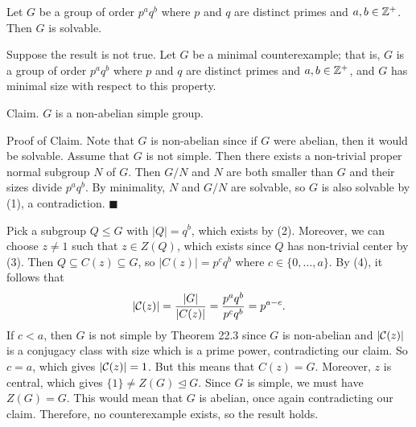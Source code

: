 \begin{theo}{}
    Let $G$ be a group of order $p^a q^b$ where $p$ and $q$ are distinct primes 
    and $a, b \in \mathbb{Z}^+$. Then $G$ is solvable. 
\end{theo}
\begin{pf}
    Suppose the result is not true. Let $G$ be a minimal counterexample; that is, 
    $G$ is a group of order $p^a q^b$ where $p$ and $q$ are distinct primes and 
    $a, b \in \mathbb{Z}^+$, and $G$ has minimal size with respect to this property. 

    {\sc Claim.} $G$ is a non-abelian simple group.  

    {\sc Proof of Claim.} Note that $G$ is non-abelian since if $G$ were 
    abelian, then it would be solvable. Assume that $G$ is not simple. 
    Then there exists a non-trivial proper normal subgroup $N$ of $G$. 
    Then $G/N$ and $N$ are both smaller than $G$ and their sizes divide $p^a q^b$. 
    By minimality, $N$ and $G/N$ are solvable, so $G$ is also solvable by (1), a 
    contradiction. \hfill$\blacksquare$ 

    Pick a subgroup $Q \leq G$ with $|Q| = q^b$, which exists by (2). Moreover, 
    we can choose $z \neq 1$ such that $z \in Z(Q)$, which exists since 
    $Q$ has non-trivial center by (3). Then $Q \subseteq C(z) \subseteq G$, 
    so $|C(z)| = p^c q^b$ where $c \in \{0, \dots, a\}$. By (4), it follows that 
    \[ |{\cal C}(z)| = \frac{|G|}{|C(z)|} = \frac{p^a q^b}{p^c q^b} = p^{a-c}. \] 
    If $c < a$, then $G$ is not simple by Theorem 22.3 since $G$ 
    is non-abelian and $|{\cal C}(z)|$ is a conjugacy class with size which is a 
    prime power, contradicting our claim. So $c = a$, which gives $|{\cal C}(z)| 
    = 1$. But this means that $C(z) = G$. Moreover, $z$ is central, which gives 
    $\{1\} \neq Z(G) \trianglelefteq G$. Since $G$ is simple, we must have 
    $Z(G) = G$. This would mean that $G$ is abelian, once again contradicting 
    our claim. Therefore, no counterexample exists, so the result holds. 
\end{pf}

